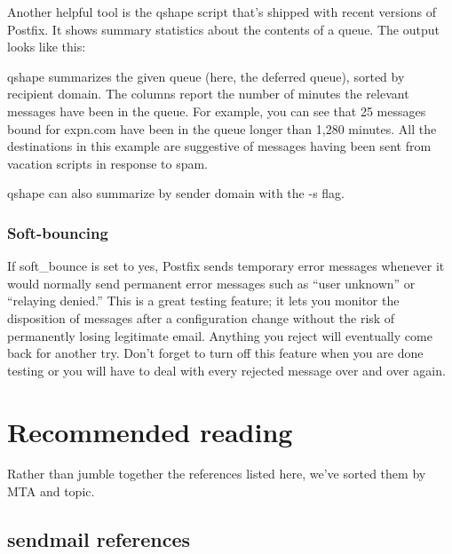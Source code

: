 Another helpful tool is the {qshape} script that's shipped with recent
versions of Postfix. It shows summary statistics about the contents of a
queue. The output looks like this:


{\protect\hypertarget{part0026_split_064.htmlux5cux23_idIndexMarker2741}{}{}}{qshape}
summarizes the given queue (here, the deferred queue), sorted by
recipient domain. The columns report the number of minutes the relevant
messages have been in the queue. For example, you can see that 25
messages bound for expn.com have been in the queue longer than 1,280
minutes. All the destinations in this example are suggestive of messages
having been sent from vacation scripts in response to spam.

{qshape} can also summarize by sender domain with the {-s} flag.

\subsubsection[Soft-bouncing]{\texorpdfstring{\protect\hypertarget{part0026_split_064.htmlux5cux23_idTextAnchor1197}{}{}Soft-bouncing}{Soft-bouncing}}

\protect\hypertarget{part0026_split_064.htmlux5cux23_idIndexMarker2742}{}{}If
\protect\hypertarget{part0026_split_064.htmlux5cux23_idIndexMarker2743}{}{}{soft\_bounce}
is set to {yes}, Postfix sends temporary error messages whenever it
would normally send permanent error messages such as ``user unknown'' or
``relaying denied.'' This is a great testing feature; it lets you
monitor the disposition of messages after a configuration change without
the risk of permanently losing legitimate email. Anything you reject
will eventually come back for another try. Don't forget to turn off this
feature when you are done testing or you will have to deal with every
rejected message over and over again.

\section{Recommended reading}

Rather than jumble together the references listed here, we've sorted them by MTA and topic.

\protect\hypertarget{part0026_split_066.html}{}{}

\hypertarget{part0026_split_066.htmlux5cux23_idContainer1247}{}
\hypertarget{part0026_split_066.htmlux5cux23calibre_pb_65}{%
\subsection[
references]{\texorpdfstring{{\protect\hypertarget{part0026_split_066.htmlux5cux23_idTextAnchor1203}{}{}sendmail}
references}{sendmail references}}\label{part0026_split_066.htmlux5cux23calibre_pb_65}}

